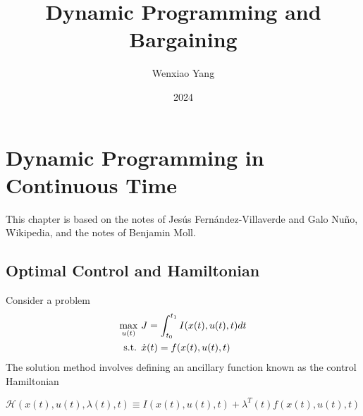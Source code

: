 \documentclass[11pt]{elegantbook}
\title{Dynamic Programming and Bargaining}
\author{Wenxiao Yang}
\institute{Haas School of Business, University of California Berkeley}
\date{2024}
\begin{document}
\maketitle

\frontmatter
\tableofcontents

\mainmatter

\chapter{Dynamic Programming in Continuous Time}
This chapter is based on the notes of Jesús Fernández-Villaverde and Galo Nuño, Wikipedia, and the notes of Benjamin Moll.

\section{Optimal Control and Hamiltonian}
Consider a problem
\begin{equation}
    \begin{aligned}
        \max_{u(t)}\ &J=\int_{t_0}^{t_1}I(x(t),u(t),t)dt\\
        \textnormal{s.t. }&\dot{x}(t)=f(x(t),u(t),t)\\
    \end{aligned}
    \nonumber
\end{equation}
The solution method involves defining an ancillary function known as the control Hamiltonian
\begin{definition}[Hamiltonian]
    $\mathcal{H}(x(t),u(t),\lambda(t),t)\equiv I(x(t),u(t),t)+\lambda^T(t)f(x(t),u(t),t)$
\end{definition}
\end{document}
